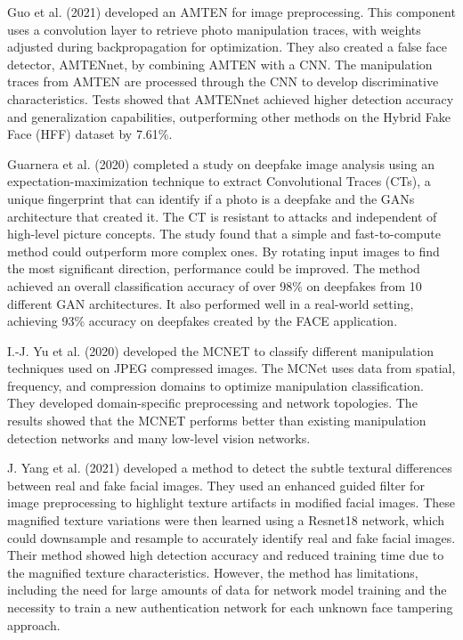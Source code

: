Guo et al. (2021)\cite{guo2021fake} developed an AMTEN for image preprocessing. This component uses a convolution layer to retrieve photo manipulation traces, with weights adjusted during backpropagation for optimization. They also created a false face detector, AMTENnet, by combining AMTEN with a CNN. The manipulation traces from AMTEN are processed through the CNN to develop discriminative characteristics. Tests showed that AMTENnet achieved higher detection accuracy and generalization capabilities, outperforming other methods on the Hybrid Fake Face (HFF) dataset by 7.61\%.

Guarnera et al. (2020)\cite{guarnera2020fighting} completed a study on deepfake image analysis using an expectation-maximization technique to extract Convolutional Traces (CTs), a unique fingerprint that can identify if a photo is a deepfake and the GANs architecture that created it. The CT is resistant to attacks and independent of high-level picture concepts. The study found that a simple and fast-to-compute method could outperform more complex ones. By rotating input images to find the most significant direction, performance could be improved. The method achieved an overall classification accuracy of over 98\% on deepfakes from 10 different GAN architectures. It also performed well in a real-world setting, achieving 93\% accuracy on deepfakes created by the FACE application.

I.-J. Yu et al. (2020)\cite{yu2020manipulation} developed the MCNET to classify different manipulation techniques used on JPEG compressed images. The MCNet uses data from spatial, frequency, and compression domains to optimize manipulation classification. They developed domain-specific preprocessing and network topologies. The results showed that the MCNET performs better than existing manipulation detection networks and many low-level vision networks.

J. Yang et al. (2021)\cite{yang2021detecting} developed a method to detect the subtle textural differences between real and fake facial images. They used an enhanced guided filter for image preprocessing to highlight texture artifacts in modified facial images. These magnified texture variations were then learned using a Resnet18 network, which could downsample and resample to accurately identify real and fake facial images. Their method showed high detection accuracy and reduced training time due to the magnified texture characteristics. However, the method has limitations, including the need for large amounts of data for network model training and the necessity to train a new authentication network for each unknown face tampering approach.

